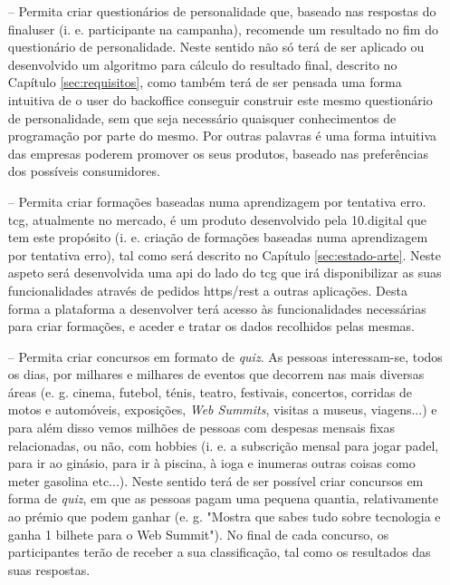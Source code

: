 \begin{itemize}
	\item[--] Permita criar questionários de personalidade que, baseado nas respostas do \gls{finaluser} (i. e. participante na campanha), recomende um resultado no fim do questionário de personalidade. Neste sentido não só terá de ser aplicado ou desenvolvido um algoritmo para cálculo do resultado final, descrito no Capítulo \ref{sec:requisitos}, como também terá de ser pensada uma forma intuitiva de o \gls{user} do \gls{backoffice} conseguir construir este mesmo questionário de personalidade, sem que seja necessário quaisquer conhecimentos de programação por parte do mesmo. Por outras palavras é uma forma intuitiva das empresas poderem promover os seus produtos, baseado nas preferências dos possíveis consumidores.
	\item[--] Permita criar formações baseadas numa aprendizagem por tentativa erro. \acrfull{tcg}\cite{tcg}, atualmente no mercado, é um produto desenvolvido pela 10.digital que tem este propósito (i. e. criação de formações baseadas numa aprendizagem por tentativa erro), tal como será descrito no Capítulo \ref{sec:estado-arte}. Neste aspeto será desenvolvida uma \acrshort{api} do lado do \acrshort{tcg} que irá disponibilizar as suas funcionalidades através de pedidos \acrshort{https}/\acrshort{rest} a outras aplicações. Desta forma a plataforma a desenvolver terá acesso às funcionalidades necessárias para criar formações, e aceder e tratar os dados recolhidos pelas mesmas.	
	\item[--] Permita criar concursos em formato de \textit{quiz}. As pessoas interessam-se, todos os dias, por milhares e milhares de eventos que decorrem nas mais diversas áreas (e. g. cinema, futebol, ténis, teatro, festivais, concertos, corridas de motos e automóveis, exposições, \textit{Web Summits}\cite{websummit}, visitas a museus, viagens...) e para além disso
	vemos milhões de pessoas com despesas mensais fixas relacionadas, ou não, com hobbies (i. e. a subscrição mensal para jogar padel, para ir ao ginásio, para ir à piscina, à ioga e inumeras outras coisas como meter gasolina etc...). Neste sentido terá de ser possível criar concursos em forma de \textit{quiz}, em que as pessoas pagam uma pequena quantia, relativamente ao prémio que podem ganhar (e. g. "Mostra que sabes tudo sobre tecnologia e ganha 1 bilhete para o Web Summit"). No final de cada concurso, os participantes terão de receber a sua classificação, tal como os resultados das suas respostas.

\end{itemize}
